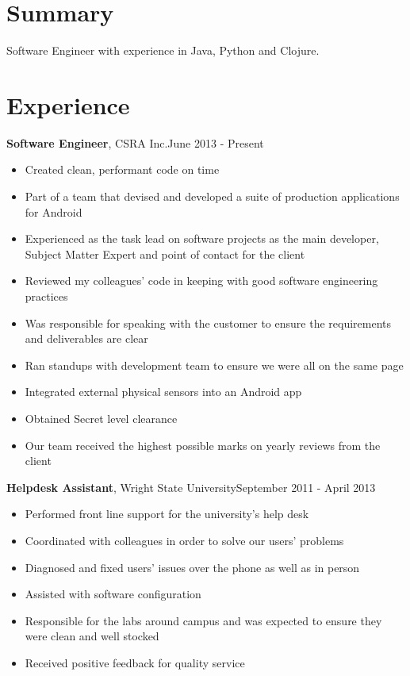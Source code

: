 \documentclass[line, margin, 10pt]{res} \setlength{\parskip}{9pt}
\begin{document}
\renewcommand{\namefont}{ \LARGE \bf }

 \address{chrispickard9@gmail.com} \address{pickard.cc}

\begin{resume}
  \section{Summary}
  Software Engineer with experience in Java, Python and Clojure.

  \section{Experience}


  {\bf Software Engineer}, CSRA Inc.\hfill June 2013 - Present
  \begin{itemize} \itemsep -2pt %
  \item Created clean, performant code on time
  \item Part of a team that devised and developed a suite of production applications for Android
  \item Experienced as the task lead on software projects as the main developer,
    Subject Matter Expert and point of contact for the client
  \item Reviewed my colleagues' code in keeping with good software engineering practices
  \item Was responsible for speaking with the customer to ensure the requirements and deliverables are clear
  \item Ran standups with development team to ensure we were all on the same page
  \item Integrated external physical sensors into an Android app
  \item Obtained Secret level clearance
  \item Our team received the highest possible marks on yearly reviews from the client
  \end{itemize}


  {\bf Helpdesk Assistant}, Wright State University\hfill September 2011 - April
  2013
  \begin{itemize} \itemsep -2pt %
  \item Performed front line support for the university's help desk
  \item Coordinated with colleagues in order to solve our users' problems
  \item Diagnosed and fixed users' issues over the phone as well as in person
  \item Assisted with software configuration
  \item Responsible for the labs around campus and was expected to ensure they
    were clean and well stocked
  \item Received positive feedback for quality service
  \end{itemize}


\end{resume}
\end{document}
